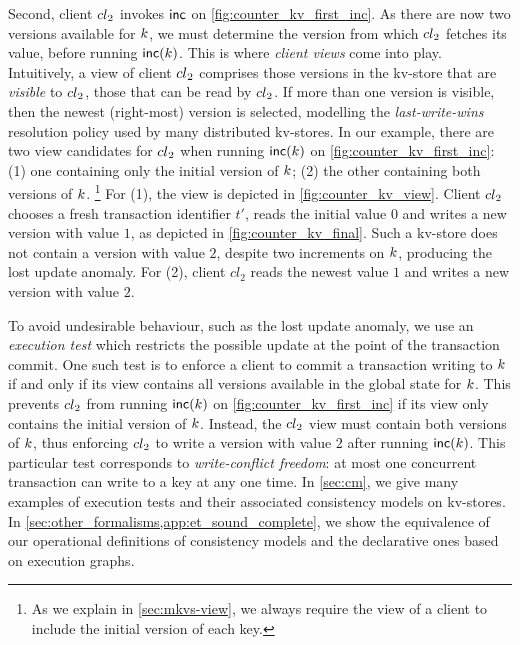 Second, client \({cl}_2\) invokes \(\mathsf{inc}\) on
\cref{fig:counter_kv_first_inc}.  As there are now two versions
available for \(k\), we must determine the version from which
\({cl}_2\) fetches its value, before running \(\mathsf{inc}(k)\).  This is
where \emph{client views} come into play.  Intuitively, a view of
client \({cl}_2\) comprises those versions in the kv-store that are
\emph{visible} to \({cl}_2\), \ie those that can be read by
\({cl}_2\).  If more than one version is visible, then the newest
(right-most) version is selected, modelling the \emph{last-write-wins}
resolution policy used by many distributed kv-stores.
In our example, there are two view candidates for \({cl}_2\) when running
\(\mathsf{inc}(k)\) on \cref{fig:counter_kv_first_inc}: (1) one containing
only the initial version of \(k\); (2) the other containing both
versions of \(k\).%
\footnote{ As we explain in \cref{sec:mkvs-view}, we always require
  the view of a client to include the initial version of each key.}  
For (1), the view is depicted in
\cref{fig:counter_kv_view}.  Client \({cl}_2\) chooses a fresh
transaction identifier \(t'\), reads the initial value \(0\) and writes a
new version with value \(1\), as depicted in
\cref{fig:counter_kv_final}.  Such a kv-store does not contain a
version with value \(2\), despite two increments on \(k\), producing
the lost update anomaly.  For (2), client \(cl_2\) reads the newest
value \(1\) and writes a new version with value \(2\).

To avoid undesirable behaviour, such as the lost update anomaly, we
use an {\em execution test} which restricts the possible update at the
point of the transaction commit.  One such test is to enforce a client
to commit a transaction writing to \(k\) if and only if its view
contains all versions available in the global state for \(k\).  This
prevents \({cl}_2\) from running \(\mathsf{inc}(k)\) on
\cref{fig:counter_kv_first_inc} if its view only contains the initial
version of \(k\).  Instead, the \({cl}_2\) view must contain both
versions of \(k\), thus enforcing \({cl}_2\) to write a version with
value \(2\) after running \(\mathsf{inc}(k)\). This particular test
corresponds to \emph{write-conflict freedom}:
at most one concurrent transaction can write to a key at any one time.
In \cref{sec:cm}, we give many examples of execution tests and their
associated consistency models on kv-stores. 
In \cref{sec:other_formalisms,app:et_sound_complete},
we show the equivalence of our operational definitions of consistency models and 
the declarative ones based on execution graphs. 


